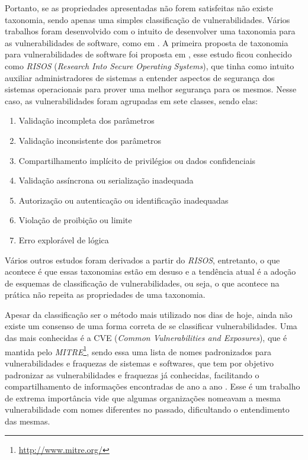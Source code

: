Portanto, se as propriedades apresentadas não forem satisfeitas não existe
taxonomia, sendo apenas uma simples classificação de vulnerabilidades. Vários
trabalhos foram desenvolvido com o intuito de desenvolver uma taxonomia para as
vulnerabilidades de software, como em
. A primeira proposta de
taxonomia para vulnerabilidades de software foi proposta em
, esse estudo ficou conhecido como \textit{RISOS}
(\textit{Research Into Secure Operating Systems}), que tinha como intuito
auxiliar administradores de sistemas a entender aspectos de segurança dos
sistemas operacionais para prover uma melhor segurança para os mesmos. Nesse
caso, as vulnerabilidades foram agrupadas em sete classes, sendo elas:

\begin{enumerate}
  \item Validação incompleta dos parâmetros
  \item Validação inconsistente dos parâmetros
  \item Compartilhamento implícito de privilégios ou dados confidenciais
  \item Validação assíncrona ou serialização inadequada
  \item Autorização ou autenticação ou identificação inadequadas
  \item Violação de proibição ou limite
  \item Erro explorável de lógica
\end{enumerate}

Vários outros estudos foram derivados a partir do \textit{RISOS}, entretanto, o
que acontece é que essas taxonomias estão em desuso e a tendência atual é a
adoção de esquemas de classificação de vulnerabilidades, ou seja, o que acontece
na prática não repeita as propriedades de uma taxonomia.

Apesar da classificação ser o método mais utilizado nos dias de hoje, ainda não
existe um consenso de uma forma correta de se classificar vulnerabilidades. Uma
das mais conhecidas é a CVE (\textit{Common Vulnerabilities and Exposures}), que
é mantida pelo \textit{MITRE}\footnote{\url{http://www.mitre.org/}}, sendo essa
uma lista de nomes padronizados para vulnerabilidades e fraquezas de sistemas e
softwares, que tem por objetivo padronizar as vulnerabilidades e fraquezas já
conhecidas, facilitando o compartilhamento de informações encontradas de ano a
ano \cite{gregio:2005}. Esse é um trabalho de extrema importância vide que
algumas organizações nomeavam a mesma vulnerabilidade com nomes diferentes no
passado, dificultando o entendimento das mesmas.

